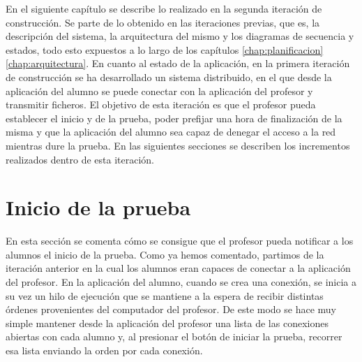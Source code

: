 
\label{chap:iteracion}

\chaptertoc

En el siguiente capítulo se describe lo realizado en la segunda iteración de construcción.
Se parte de lo obtenido en las iteraciones previas, que es, la descripción del sistema, la arquitectura del mismo y los diagramas de secuencia y estados, todo esto expuestos a lo largo de los capítulos \ref{chap:planificacion} \ref{chap:arquitectura}.
En cuanto al estado de la aplicación, en la primera iteración de construcción se ha desarrollado un sistema distribuido, en el que desde la aplicación del alumno se puede conectar con la aplicación del profesor y transmitir ficheros.
El objetivo de esta iteración es que el profesor pueda establecer el inicio y de la prueba, poder prefijar una hora de finalización de la misma y que la aplicación del alumno sea capaz de denegar el acceso a la red mientras dure la prueba. %
En las siguientes secciones se describen los incrementos realizados dentro de esta iteración.


\section{Inicio de la prueba}
\label{sec:iteracion:iniPrueba}

En esta sección se comenta cómo se consigue que el profesor pueda notificar a los alumnos el inicio de la prueba.
Como ya hemos comentado, partimos de la iteración anterior en la cual los alumnos eran capaces de conectar a la aplicación del profesor. En la aplicación del alumno, cuando se crea una conexión, se inicia a su vez un hilo de ejecución que se mantiene a la espera de recibir distintas órdenes provenientes del computador del profesor. De este modo se hace muy simple mantener desde la aplicación del profesor una lista de las conexiones abiertas con cada alumno y, al presionar el botón de iniciar la prueba, recorrer esa lista enviando la orden por cada conexión.

